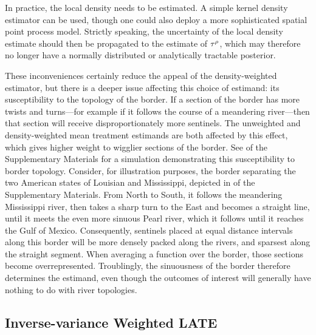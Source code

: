 In practice, the local density needs to be estimated.
A simple kernel density estimator can be used,
though one could also deploy a more sophisticated spatial point process model.
Strictly speaking, the uncertainty of the local density estimate should then be propagated to the estimate of \(\tau^{\rho}\), which may therefore no longer have a normally distributed or analytically tractable posterior.

These inconveniences certainly reduce the appeal of the density-weighted estimator,
but there is a deeper issue affecting this choice of estimand: its susceptibility to the topology of the border.
If a section of the border has more twists and turns---for example if it follows the course of a meandering river---then that section will receive disproportionately more sentinels.
The unweighted and density-weighted mean treatment estimands are both affected by this effect,
which gives higher weight to wigglier sections of the border.
See  of the Supplementary Materials for a simulation demonstrating this susceptibility to border topology.
Consider, for illustration purposes, the border separating the two American states of Louisian and Mississippi, depicted in  of the Supplementary Materials.
From North to South, it follows the meandering Mississippi river, then takes a sharp turn to the East and becomes a straight line, until it meets the even more sinuous Pearl river, which it follows until it reaches the Gulf of Mexico.
Consequently, sentinels placed at equal distance intervals along this border will be more densely packed along the rivers, and sparsest along the straight segment.
When averaging a function over the border, those sections become overrepresented.
Troublingly, the sinuousness of the border therefore determines the estimand, even though the outcomes of interest will generally have nothing to do with river topologies.


\subsection{Inverse-variance Weighted LATE}
\label{sec:invvar}


